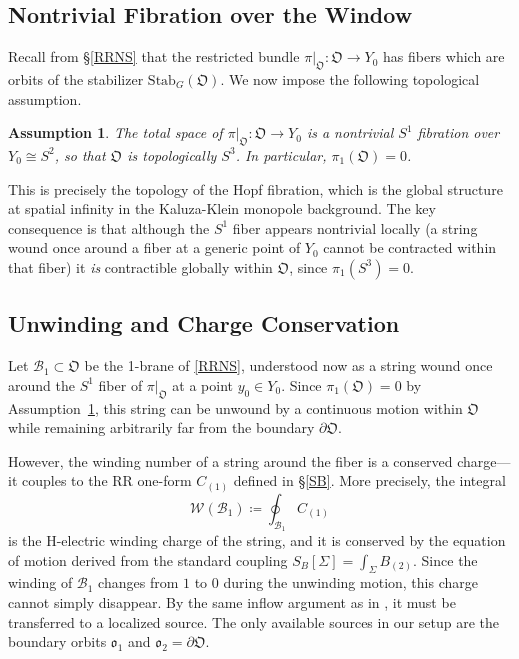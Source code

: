 \documentclass{article}
\newtheorem{as}{Assumption}
\numberwithin{tm}{section}
\numberwithin{dn}{section}
\numberwithin{as}{section}
\numberwithin{rk}{section}
\numberwithin{lem}{section}
\numberwithin{ax}{section}
\numberwithin{pp}{section}
\numberwithin{eg}{section}
\numberwithin{war}{section}
\numberwithin{equation}{section}
\numberwithin{prop}{section}
\numberwithin{nt}{section}
\numberwithin{rc}{section}
\numberwithin{setup}{section}
\begin{document}
\subsection{Nontrivial Fibration over the Window}

Recall from \S\ref{RRNS} that the restricted bundle $\pi|_{\mathfrak{O}} : \mathfrak{O} \to Y_0$ has fibers which are orbits of the stabilizer $\mathrm{Stab}_G(\mathfrak{O})$. We now impose the following topological assumption.

\begin{as} \label{hopf-as}
	The total space of $\pi|_{\mathfrak{O}} : \mathfrak{O} \to Y_0$ is a nontrivial $S^1$ fibration over $Y_0 \cong S^2$, so that $\mathfrak{O}$ is topologically $S^3$. In particular, $\pi_1(\mathfrak{O}) = 0$.
\end{as}

This is precisely the topology of the Hopf fibration, which is the global structure at spatial infinity in the Kaluza-Klein monopole background. The key consequence is that although the $S^1$ fiber appears nontrivial locally (a string wound once around a fiber at a generic point of $Y_0$ cannot be contracted within that fiber) it \emph{is} contractible globally within $\mathfrak{O}$, since $\pi_1(S^3) = 0$.

\subsection{Unwinding and Charge Conservation}

Let $\mathcal{B}_1 \subset \mathfrak{O}$ be the 1-brane of \ref{RRNS}, understood now as a string wound once around the $S^1$ fiber of $\pi|_{\mathfrak{O}}$ at a point $y_0 \in Y_0$. Since $\pi_1(\mathfrak{O}) = 0$ by Assumption~\ref{hopf-as}, this string can be unwound by a continuous motion within $\mathfrak{O}$ while remaining arbitrarily far from the boundary $\partial\mathfrak{O}$.

However, the winding number of a string around the fiber is a conserved charge---it couples to the RR one-form $C_{(1)}$ defined in \S\ref{SB}. More precisely, the integral
\[
\mathcal{W}(\mathcal{B}_1) \coloneq \oint_{\mathcal{B}_1} C_{(1)}
\]
is the H-electric winding charge of the string, and it is conserved by the equation of motion derived from the standard coupling $S_B[\Sigma] = \int_\Sigma B_{(2)}$. Since the winding of $\mathcal{B}_1$ changes from $1$ to $0$ during the unwinding motion, this charge cannot simply disappear. By the same inflow argument as in \cite{GHM}, it must be transferred to a localized source. The only available sources in our setup are the boundary orbits $\mathfrak{o}_1$ and $\mathfrak{o}_2 = \partial\mathfrak{O}$.
\end{document}
